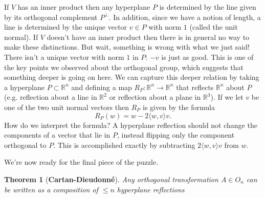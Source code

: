 \documentclass{article}
\newcommand{\R}{\mathbb{R}}
\newtheorem{theorem}{Theorem}[section]
\begin{document}
If $V$ has an inner product then any hyperplane $P$ is determined by the line given by its orthogonal complement $P^\perp$. In addition, since we have a notion of length, a line is determined by the unique vector $v \in P$ with norm $1$ (called the unit normal). If $V$ doesn't have an inner product then there is in general no way to make these distinctions. But wait, something is wrong with what we just said! There isn't a unique vector with norm $1$ in $P$: $-v$ is just as good. This is one of the key points we observed about the orthogonal group, which suggests that something deeper is going on here. We can capture this deeper relation by taking a hyperplane $P \subset \R^n$ and defining a map $R_P : \R^n \to \R^n$ that reflects $\R^n$ about $P$ (e.g. reflection about a line in $\R^2$ or reflection about a plane in $\R^3$). If we let $v$ be one of the two unit normal vectors then $R_P$ is given by the formula
$$R_P(w) = w -2\langle w, v \rangle v.$$
How do we interpret the formula? A hyperplane reflection should not change the components of a vector that lie in $P$, instead flipping only the component orthogonal to $P$. This is accomplished exactly by subtracting $2\langle w,v \rangle v$ from $w$. 

We're now ready for the final piece of the puzzle.

\vspace{0.5em}

\begin{theorem}[\textbf{Cartan-Dieudonn\'e}]
Any orthogonal transformation $A \in O_n$ can be written as a composition of $\leq n$ hyperplane reflections
\end{theorem}
\end{document}
